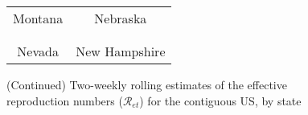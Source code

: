 \documentclass[12pt]{article}
\begin{document}
\begin{figure}[!p]%
\caption
{(Continued) Two-weekly rolling estimates of the effective reproduction numbers ($\mathcal
{R}_{et}$) for the contiguous US, by state}%
\vspace{-0.3cm}%


\begin{center}%
\hspace*{-0.2cm}%
\begin{tabular}
[c]{cc}%
{\footnotesize Montana} & {\footnotesize Nebraska}\\%
{\includegraphics[
height=1.7763in,
width=3.5293in
]%
{figs/US-Re-MT-2W.png}%
}
&
{\includegraphics[
height=1.7763in,
width=3.5293in
]%
{figs/US-Re-NE-2W.png}%
}
\\
& \\
{\footnotesize Nevada} & {\footnotesize New Hampshire}\\%

\end{tabular}
\end{center}
\end{figure}
\end{document}
